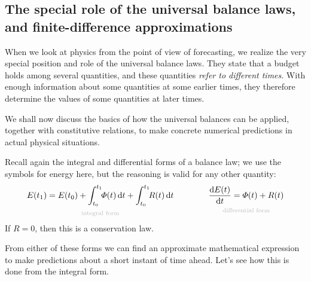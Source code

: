 \documentclass[a4paper,12pt,%
onecolumn,oneside,titlepage,%
british%
]{memoir}
\newcommand*{\di}{\mathrm{d}}%
\renewcommand*{\|}[1][]{\nonscript\:#1\vert\nonscript\:\mathopen{}}
\newcommand*{\yti}{t_{0}}
\newcommand*{\ytf}{t_{1}}
\newcommand*{\yE}{E}
\newcommand*{\yH}{\varPhi}%
\newcommand*{\yR}{R}%
\begin{document}
\subsection{The special role of the universal balance laws, and finite-difference approximations}
\label{sec:forecast_balances}

When we look at physics from the point of view of forecasting, we realize the very special position and role of the universal balance laws. They state that a budget holds among several quantities, and these quantities \emph{refer to different times}. With enough information about some quantities at some earlier times, they therefore determine the values of some quantities at later times.

We shall now discuss the basics of how the universal balances can be applied, together with constitutive relations, to make concrete numerical predictions in actual physical situations.

\smallskip


Recall again the integral and differential forms of a balance law; we use the symbols for energy here, but the reasoning is valid for any other quantity:
\begin{equation*}
      \underbracket[0pt]{\yE(\ytf) = \yE(\yti) + \int_{\yti}^{\ytf}\!\!\yH(t)\,\di t + \int_{\yti}^{\ytf}\!\!\yR(t)\,\di t}_{\mathclap{\text{\color{grey}integral form}}}
      \qquad%
      \qquad
      \underbracket[0pt]{\frac{\di\yE(t)}{\di t} = \yH(t) + \yR(t)}_{\mathclap{\text{\color{grey}differential form}}}
\end{equation*}
If $\yR=0$, then this is a conservation law.

From either of these forms we can find an approximate mathematical expression to make predictions about a short instant of time ahead. Let's see how this is done from the integral form.
\end{document}

